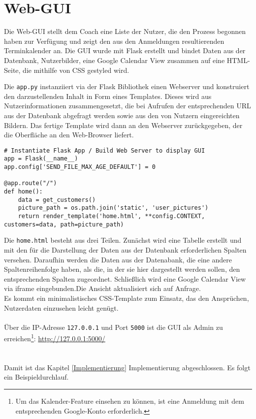     
    \section{Web-GUI}
        Die Web-GUI stellt dem Coach eine Liste der Nutzer, die den Prozess begonnen haben zur Verfügung und zeigt den aus den Anmeldungen resultierenden Terminkalender an. Die GUI wurde mit Flask erstellt und bindet Daten aus der Datenbank, Nutzerbilder, eine Google Calendar View zusammen auf eine HTML-Seite, die mithilfe von CSS gestyled wird.
        
        Die \verb|app.py| instanziiert via der Flask Bibliothek einen Webserver und konstruiert den darzustellenden Inhalt in Form eines Templates. Dieses wird aus Nutzerinformationen zusammengesetzt, die bei Aufrufen der entsprechenden URL aus der Datenbank abgefragt werden sowie aus den von Nutzern eingereichten Bildern. 
        Das fertige Template wird dann an den Webserver zurückgegeben, der die Oberfläche an den Web-Browser liefert.

        \begin{lstlisting}
# Instantiate Flask App / Build Web Server to display GUI
app = Flask(__name__)
app.config['SEND_FILE_MAX_AGE_DEFAULT'] = 0

@app.route("/")
def home():
    data = get_customers()
    picture_path = os.path.join('static', 'user_pictures')
    return render_template('home.html', **config.CONTEXT, customers=data, path=picture_path)
        \end{lstlisting}

        Die \verb|home.html| besteht aus drei Teilen. Zunächst wird eine Tabelle erstellt und mit den für die Darstellung der Daten aus der Datenbank erforderlichen Spalten versehen. Daraufhin werden die Daten aus der Datenabank, die eine andere Spaltenreihenfolge haben, als die, in der sie hier dargestellt werden sollen, den entsprechenden Spalten zugeordnet.
        Schließlich wird eine Google Calendar View via iframe eingebunden.Die Ansicht aktualisiert sich auf Anfrage. \\
        Es kommt ein minimalistisches CSS-Template zum Einsatz, das den Ansprüchen, Nutzerdaten einzusehen leicht genügt.\\ \\

        Über die IP-Adresse \verb|127.0.0.1| und Port \verb|5000| ist die GUI als Admin zu erreichen\footnote{Um das Kalender-Feature einsehen zu können, ist eine Anmeldung mit dem entsprechenden Google-Konto erforderlich.}: \url{http://127.0.0.1:5000/} \\ \\ \\


    Damit ist das Kapitel \ref*{Implementierung} Implementierung abgeschlossen. Es folgt ein Beispieldurchlauf.


